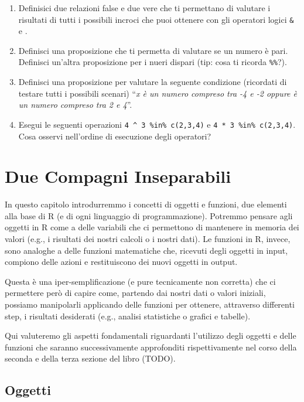 \documentclass[
]{book}
\providecommand{\tightlist}{%
  \setlength{\itemsep}{0pt}\setlength{\parskip}{0pt}}
\begin{document}
\begin{enumerate}
\def\labelenumi{\arabic{enumi}.}
\tightlist
\item
  Definisici due relazioni false e due vere che ti permettano di valutare i risultati di tutti i possibili incroci che puoi ottenere con gli operatori logici \texttt{\&} e \texttt{\textbar{}}.
\item
  Definisci una proposizione che ti permetta di valutare se un numero è pari. Definisci un'altra proposizione per i nueri dispari (tip: cosa ti ricorda \texttt{\%\%}?).
\item
  Definisci una proposizione per valutare la seguente condizione (ricordati di testare tutti i possibili scenari) ``\emph{x è un numero compreso tra -4 e -2 oppure è un numero compreso tra 2 e 4}''.
\item
  Esegui le seguenti operazioni \texttt{4\ \^{}\ 3\ \%in\%\ c(2,3,4)} e \texttt{4\ *\ 3\ \%in\%\ c(2,3,4)}. Cosa osservi nell'ordine di esecuzione degli operatori?
\end{enumerate}

\hypertarget{objects-functions}{%
\chapter{Due Compagni Inseparabili}\label{objects-functions}}

In questo capitolo introdurremmo i concetti di oggetti e funzioni, due elementi alla base di R (e di ogni linguaggio di programmazione). Potremmo pensare agli oggetti in R come a delle variabili che ci permettono di mantenere in memoria dei valori (e.g., i risultati dei nostri calcoli o i nostri dati). Le funzioni in R, invece, sono analoghe a delle funzioni matematiche che, ricevuti degli oggetti in input, compiono delle azioni e restituiscono dei nuovi oggetti in output.

Questa è una iper-semplificazione (e pure tecnicamente non corretta) che ci permettere però di capire come, partendo dai nostri dati o valori iniziali, possiamo manipolarli applicando delle funzioni per ottenere, attraverso differenti step, i risultati desiderati (e.g., analisi statistiche o grafici e tabelle).

Qui valuteremo gli aspetti fondamentali riguardanti l'utilizzo degli oggetti e delle funzioni che saranno successivamente approfonditi rispettivamente nel corso della seconda e della terza sezione del libro (TODO).

\hypertarget{objects-section}{%
\section{Oggetti}\label{objects-section}}
\end{document}
